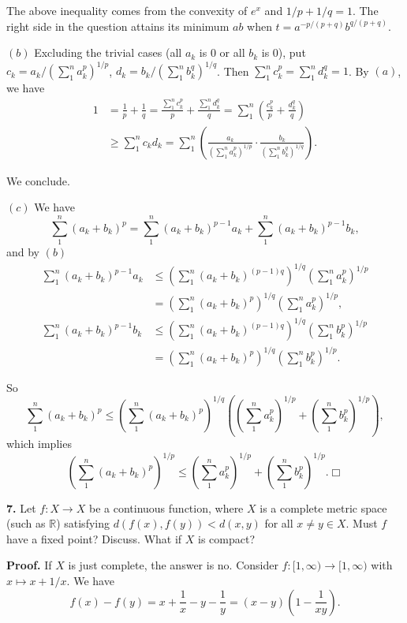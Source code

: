 \documentclass{article}
\begin{document}
The above inequality comes from the convexity of $e^x$ and
$1/p + 1/q = 1$. The right side in the question attains its minimum $ab$
when $t = a^{-p/(p+q)} b^{q/(p+q)}$.

$(b)$ Excluding the trivial cases (all $a_k$ is $0$ or all $b_k$ is
$0$), put $c_k = a_k/\left(\sum_{1}^n a_k^p\right)^{1/p}$,
$d_k = b_k/\left(\sum_{1}^n b_k^q\right)^{1/q}$. Then
$\sum_{1}^n c_k^p = \sum_{1}^n d_k^q = 1$. By $(a)$, we have
\[\begin{aligned}
1  &=\frac{1}{p} + \frac{1}{q} = \frac{\sum_{1}^n c_k^p}{p} + \frac{\sum_{1}^n d_k^q }{q} = \sum_{1}^n \left(\frac{c_k^p}{p} + \frac{d_k^q}{q}\right)\\
&\ge \sum_{1}^n c_k d_k  = \sum_1^n \left(\frac{a_k}{\left(\sum_{1}^n a_k^p\right)^{1/p}}\cdot\frac{b_k}{\left(\sum_{1}^n b_k^q\right)^{1/q}}\right).
\end{aligned}\]

We conclude.

$(c)$ We have
\[\sum_1^n(a_k+b_k)^p = \sum_1^n(a_k+b_k)^{p-1}a_k + \sum_1^n(a_k+b_k)^{p-1}b_k,\]
and by $(b)$ \[\begin{aligned}
\sum_1^n(a_k+b_k)^{p-1}a_k &\le \left(\sum_1^n (a_k+b_k)^{(p-1)q}\right)^{1/q}\left(\sum_1^n a_k^p\right)^{1/p}\\
&= \left(\sum_1^n (a_k+b_k)^p\right)^{1/q}\left(\sum_1^n a_k^p\right)^{1/p},\\
\sum_1^n(a_k+b_k)^{p-1}b_k &\le \left(\sum_1^n (a_k+b_k)^{(p-1)q}\right)^{1/q}\left(\sum_1^n b_k^p\right)^{1/p}\\
&= \left(\sum_1^n (a_k+b_k)^{p}\right)^{1/q}\left(\sum_1^n b_k^p\right)^{1/p}.
\end{aligned}\]

So
\[ \sum_1^n(a_k+b_k)^p \le \left(\sum_1^n (a_k+b_k)^{p}\right)^{1/q} \left( \left(\sum_1^n a_k^p\right)^{1/p} + \left(\sum_1^n b_k^p\right)^{1/p}\right),\]
which implies
\[\left(\sum_1^n (a_k+b_k)^p\right)^{1/p}\le \left(\sum_1^n a_k^p\right)^{1/p} + \left(\sum_1^n b_k^p\right)^{1/p}.\Box \]

    \textbf{7.} Let $f:X\to X$ be a continuous function, where $X$ is a
complete metric space (such as $\mathbb{R}$) satisfying
$d(f(x), f(y)) < d(x, y)$ for all $x\ne y\in X$. Must $f$ have a fixed
point? Discuss. What if $X$ is compact?

\textbf{Proof.} If $X$ is just complete, the answer is no. Consider
$f:[1,\infty) \to [1,\infty)$ with $x\mapsto x + 1/x$. We have
\[ f(x)- f(y) = x+ \frac{1}{x} - y - \frac{1}{y} = (x-y)\left(1- \frac{1}{xy}\right).\]
\end{document}
